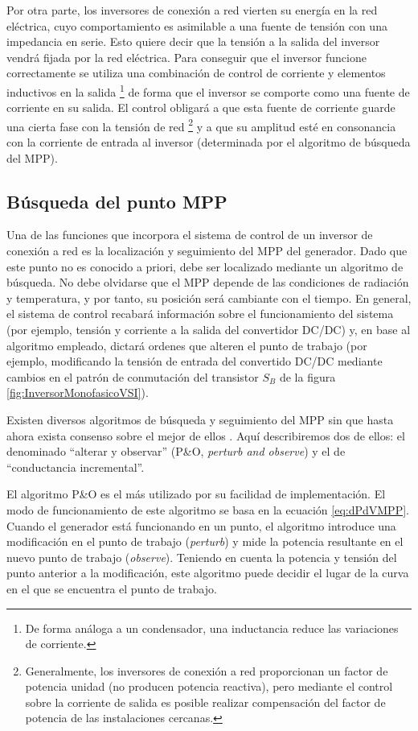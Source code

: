 Por otra parte, los inversores de conexión a red vierten su energía
en la red eléctrica, cuyo comportamiento es asimilable a una fuente
de tensión con una impedancia en serie. Esto quiere decir que la tensión
a la salida del inversor vendrá fijada por la red eléctrica. Para
conseguir que el inversor funcione correctamente se utiliza una combinación
de control de corriente y elementos inductivos en la salida%
\footnote{De forma análoga a un condensador, una inductancia reduce las variaciones
de corriente.%
} de forma que el inversor se comporte como una fuente de corriente
en su salida. El control obligará a que esta fuente de corriente guarde
una cierta fase con la tensión de red%
\footnote{Generalmente, los inversores de conexión a red proporcionan un factor
de potencia unidad (no producen potencia reactiva), pero mediante
el control sobre la corriente de salida es posible realizar compensación
del factor de potencia de las instalaciones cercanas.%
} y a que su amplitud esté en consonancia con la corriente de entrada
al inversor (determinada por el algoritmo de búsqueda del MPP).


\subsection{Búsqueda del punto MPP\label{sub:BusquedaMPP}}

Una de las funciones que incorpora el sistema de control de un inversor
de conexión a red es la localización y seguimiento del MPP del generador.
Dado que este punto no es conocido a priori, debe ser localizado mediante
un algoritmo de búsqueda. No debe olvidarse que el MPP depende de
las condiciones de radiación y temperatura, y por tanto, su posición
será cambiante con el tiempo. En general, el sistema de control recabará
información sobre el funcionamiento del sistema (por ejemplo, tensión
y corriente a la salida del convertidor DC/DC) y, en base al algoritmo
empleado, dictará ordenes que alteren el punto de trabajo (por ejemplo,
modificando la tensión de entrada del convertido DC/DC mediante cambios
en el patrón de conmutación del transistor $S_{B}$ de la figura \ref{fig:InversorMonofasicoVSI}). 

Existen diversos algoritmos de búsqueda y seguimiento del MPP sin
que hasta ahora exista consenso sobre el mejor de ellos \cite{Hohn.Ropp2002}.
Aquí describiremos dos de ellos: el denominado {}``alterar y observar''
(P\&O, \emph{perturb and observe}) y el de {}``conductancia incremental''. 

El algoritmo P\&O es el más utilizado por su facilidad de implementación.
El modo de funcionamiento de este algoritmo se basa en la ecuación
\ref{eq:dPdVMPP}. Cuando el generador está funcionando en un punto,
el algoritmo introduce una modificación en el punto de trabajo (\emph{perturb})
y mide la potencia resultante en el nuevo punto de trabajo (\emph{observe}).
Teniendo en cuenta la potencia y tensión del punto anterior a la modificación,
este algoritmo puede decidir el lugar de la curva en el que se encuentra
el punto de trabajo. 

